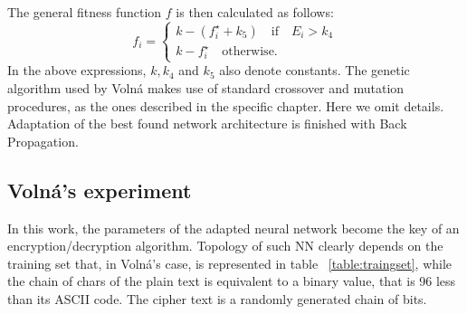 \documentclass[%
    corpo=11pt,
    twoside,
    stile=classica,
    oldstyle,
    autoretitolo,
    tipotesi=magistrale,
    greek,
    evenboxes,
    english
]{toptesi}
\begin{document}
The general fitness function  $f$ is then calculated as follows:
$$
f_i = \begin{cases}
k - (f_i^{\star} + k_5) \quad \text{if} \quad E_i > k_4 \\
k - f_i^{\star} \quad \text{otherwise.}
\end{cases} 
$$ 
In the above expressions, $k, k_4$ and $k_5$ also denote constants.
The genetic algorithm used by Volná makes use of standard crossover and mutation procedures, as the ones described in the specific chapter. Here we omit details. \\
Adaptation of the best found network architecture is finished with Back Propagation.

\subsection{Volná's experiment}
In this work, the parameters of the adapted neural network become the key of an encryption/decryption algorithm. Topology of such NN clearly depends on the training set that, in Volná's case, is represented in table ~\ref{table:traingset}, while the chain of chars of the plain text is equivalent to a binary value, that is 96 less than its ASCII code. The cipher text is a randomly generated chain of bits.
\end{document}
